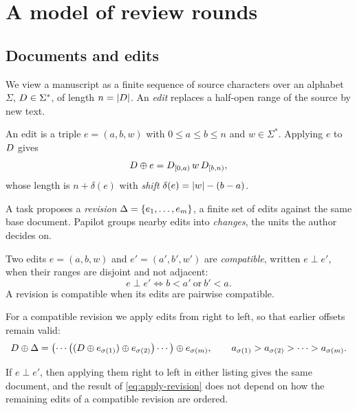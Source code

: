 \section{A model of review rounds}
\label{sec:model}

\subsection{Documents and edits}

We view a manuscript as a finite sequence of source characters over an
alphabet $\Sigma$, $D \in \Sigma^{*}$, of length $n = \lvert D\rvert$. An
\emph{edit} replaces a half-open range of the source by new text.

\begin{definition}[Edit]
An edit is a triple $e = (a, b, w)$ with $0 \le a \le b \le n$ and
$w \in \Sigma^{*}$. Applying $e$ to $D$ gives
\begin{equation}
  D \oplus e = D_{[0,a)} \, w \, D_{[b,n)},
  \label{eq:apply}
\end{equation}
whose length is $n + \delta(e)$ with \emph{shift} $\delta(e) = \lvert w\rvert - (b - a)$.
\end{definition}

A task proposes a \emph{revision} $\Delta = \{e_1, \dots, e_m\}$, a finite set
of edits against the same base document. Papilot groups nearby edits into
\emph{changes}, the units the author decides on.

\begin{definition}[Compatibility]
Two edits $e = (a, b, w)$ and $e' = (a', b', w')$ are \emph{compatible},
written $e \perp e'$, when their ranges are disjoint and not adjacent:
\begin{equation}
  e \perp e' \iff b < a' \ \text{or}\ b' < a .
  \label{eq:compatible}
\end{equation}
A revision is compatible when its edits are pairwise compatible.
\end{definition}

For a compatible revision we apply edits from right to left, so that earlier
offsets remain valid:
\begin{equation}
  D \oplus \Delta
  = \bigl(\cdots\bigl((D \oplus e_{\sigma(1)}) \oplus e_{\sigma(2)}\bigr)
    \cdots\bigr) \oplus e_{\sigma(m)},
  \qquad a_{\sigma(1)} > a_{\sigma(2)} > \dots > a_{\sigma(m)} .
  \label{eq:apply-revision}
\end{equation}

\begin{proposition}
\label{prop:commute}
If $e \perp e'$, then applying them right to left in either listing gives the
same document, and the result of \cref{eq:apply-revision} does not depend on
how the remaining edits of a compatible revision are ordered.
\end{proposition}

